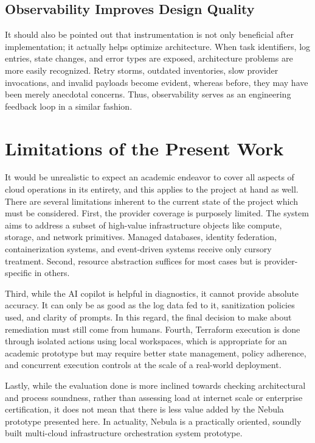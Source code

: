 \subsection{Observability Improves Design Quality}
It should also be pointed out that instrumentation is not only beneficial after implementation; it actually helps optimize architecture. When task identifiers, log entries, state changes, and error types are exposed, architecture problems are more easily recognized. Retry storms, outdated inventories, slow provider invocations, and invalid payloads become evident, whereas before, they may have been merely anecdotal concerns. Thus, observability serves as an engineering feedback loop in a similar fashion.

\section{Limitations of the Present Work}
It would be unrealistic to expect an academic endeavor to cover all aspects of cloud operations in its entirety, and this applies to the project at hand as well. There are several limitations inherent to the current state of the project which must be considered. First, the provider coverage is purposely limited. The system aims to address a subset of high-value infrastructure objects like compute, storage, and network primitives. Managed databases, identity federation, containerization systems, and event-driven systems receive only cursory treatment. Second, resource abstraction suffices for most cases but is provider-specific in others.


Third, while the AI copilot is helpful in diagnostics, it cannot provide absolute accuracy. It can only be as good as the log data fed to it, sanitization policies used, and clarity of prompts. In this regard, the final decision to make about remediation must still come from humans. Fourth, Terraform execution is done through isolated actions using local workspaces, which is appropriate for an academic prototype but may require better state management, policy adherence, and concurrent execution controls at the scale of a real-world deployment.


Lastly, while the evaluation done is more inclined towards checking architectural and process soundness, rather than assessing load at internet scale or enterprise certification, it does not mean that there is less value added by the Nebula prototype presented here. In actuality, Nebula is a practically oriented, soundly built multi-cloud infrastructure orchestration system prototype.

